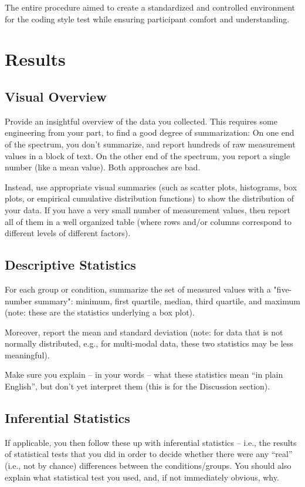 \documentclass{article}
\begin{document}
The entire procedure aimed to create a standardized and controlled environment for the coding style test while ensuring participant comfort and understanding.


\section{Results}
\subsection{Visual Overview}
Provide an insightful overview of the data you collected. This requires some engineering from your part, to find a good degree of summarization: On one end of the spectrum, you don't summarize, and report hundreds of raw measurement values in a block of text. On the other end of the spectrum, you report a single number (like a mean value). Both approaches are bad.

Instead, use appropriate visual summaries (such as scatter plots, histograms, box plots, or empirical cumulative distribution functions) to show the distribution of your data. If you have a very small number of measurement values, then report all of them in a well organized table (where rows and/or columns correspond to different levels of different factors).


\subsection{Descriptive Statistics}

For each group or condition, summarize the set of measured values with a "five-number summary": minimum, first quartile, median, third quartile, and maximum (note: these are the statistics underlying a box plot).

Moreover, report the mean and standard deviation (note: for data that is not normally distributed, e.g., for multi-modal data, these two statistics may be less meaningful).

Make sure you explain – in your words – what these statistics mean “in plain English”, but don’t yet interpret them (this is for the Discussion section).

\subsection{Inferential Statistics}
If applicable, you then follow these up with inferential statistics – i.e., the results of statistical tests that you did in order to decide whether there were any “real” (i.e., not by chance) differences between the conditions/groups. You should also explain what statistical test you used, and, if not immediately obvious, why.
\end{document}
